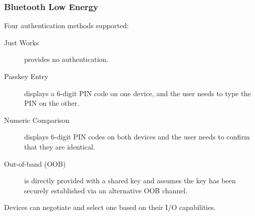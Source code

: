 \subsubsection{Bluetooth Low Energy}
Four authentication methods supported:
\begin{description}
  \item[Just Works] provides no authentication.
  \item[Passkey Entry] displays a 6-digit PIN code on one device, and the user needs to
    type the PIN on the other.
  \item[Numeric Comparison] displays 6-digit PIN codes on both devices and the
    user needs to confirm that they are identical.
  \item[Out-of-band (OOB)] is directly provided with a shared key and assumes the key
    has been securely established via an alternative OOB channel.
\end{description}
Devices can negotiate and select one based on their I/O capabilities.

